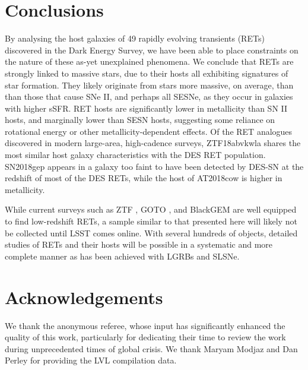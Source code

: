 \documentclass[fleqn,usenatbib,]{mnras}
\begin{document}

\section{Conclusions}
\label{sec:conc}
By analysing the host galaxies of 49 rapidly evolving transients (RETs) discovered in the Dark Energy Survey, we have been able to place constraints on the nature of these as-yet unexplained phenomena. We conclude that RETs are strongly linked to massive stars, due to their hosts all exhibiting signatures of star formation. They likely originate from stars more massive, on average, than than those that cause SNe II, and perhaps all SESNe, as they occur in galaxies with higher sSFR. RET hosts are significantly lower in metallicity than SN II hosts, and marginally lower than SESN hosts, suggesting some reliance on rotational energy or other metallicity-dependent effects.
Of the RET analogues discovered in modern large-area, high-cadence surveys, ZTF18abvkwla shares the most similar host galaxy characteristics with the DES RET population. SN2018gep appears in a galaxy too faint to have been detected by DES-SN at the redshift of most of the DES RETs, while the host of AT2018cow is higher in metallicity.

While current surveys such as ZTF \citep{Bellm2019}, GOTO \citep{Dyer2018}, and BlackGEM \citep{Bloemen2016} are well equipped to find low-redshift RETs, a sample similar to that presented here will likely not be collected until LSST comes online. With several hundreds of objects, detailed studies of RETs and their hosts will be possible in a systematic and more complete manner as has been achieved with LGRBs and SLSNe.

\section*{Acknowledgements}

We thank the anonymous referee, whose input has significantly enhanced the quality of this work, particularly for dedicating their time to review the work during unprecedented times of global crisis. We thank Maryam Modjaz and Dan Perley for providing the LVL compilation data.
\end{document}
